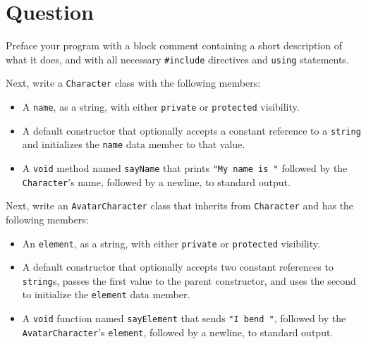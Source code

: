 \newEvenPage

\section{Question}


Preface your program with a block comment containing a short description of
what it does, and with all necessary \texttt{#include} directives and
\texttt{using} statements.

Next, write a \texttt{Character} class with the following members:
\begin{itemize}
  \item A \texttt{name}, as a string, with either
    \texttt{private} or \texttt{protected} visibility.
  \item A default constructor that optionally accepts a constant reference to a
    \texttt{string} and initializes the \texttt{name} data
    member to that value.
  \item A \texttt{void} method named \texttt{sayName} that
    prints \texttt{"My name is "} followed by the
    \texttt{Character}'s name, followed by a newline, to standard
    output.
\end{itemize}

Next, write an \texttt{AvatarCharacter} class that inherits from
\texttt{Character} and has the following members:
\begin{itemize}
  \item An \texttt{element}, as a string, with either
    \texttt{private} or \texttt{protected} visibility.
  \item A default constructor that optionally accepts two constant references
    to \texttt{string}s, passes the first value to the parent
    constructor, and uses the second to initialize the
    \texttt{element} data member.
  \item A \texttt{void} function named \texttt{sayElement}
    that sends \texttt{"I bend "}, followed by the
    \texttt{AvatarCharacter}'s \texttt{element}, followed by
    a newline, to standard output.
\end{itemize}

